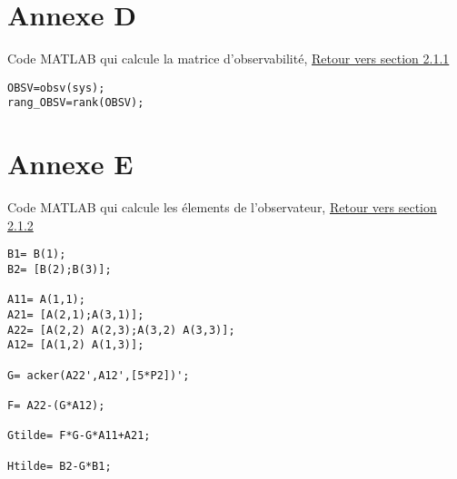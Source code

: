 \chapter*{Annexe D}
	
	Code MATLAB qui calcule la matrice d'observabilité,\label{Annexe D} \hyperref[OBSV]{Retour vers section 2.1.1}
	
	\begin{lstlisting}	
OBSV=obsv(sys);
rang_OBSV=rank(OBSV);
	\end{lstlisting}		
	
	
	\chapter*{Annexe E}
	
	Code MATLAB qui calcule les élements de l'observateur,\label{Annexe E} \hyperref[calobs]{Retour vers section 2.1.2}
	
	\begin{lstlisting}	
B1= B(1);
B2= [B(2);B(3)];

A11= A(1,1);
A21= [A(2,1);A(3,1)];
A22= [A(2,2) A(2,3);A(3,2) A(3,3)]; 
A12= [A(1,2) A(1,3)];   

G= acker(A22',A12',[5*P2])';

F= A22-(G*A12);

Gtilde= F*G-G*A11+A21;
   
Htilde= B2-G*B1;
	\end{lstlisting}	
